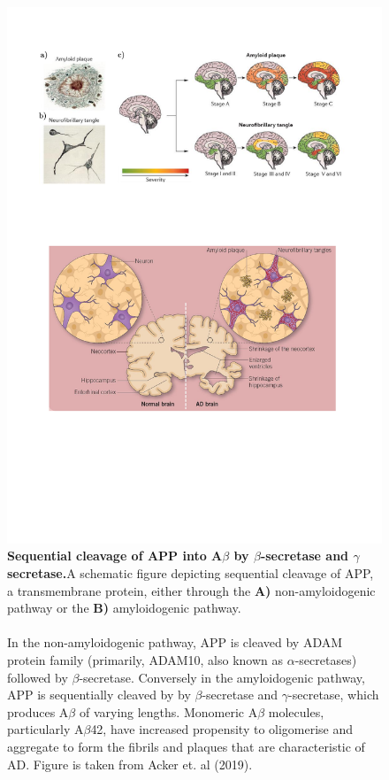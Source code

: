 \begin{figure}[!htp]
	\centering
	\includegraphics[page=2,trim={0.5cm 9cm 0cm 15cm},clip, scale = 0.8]{Figures/Introduction_Figures.pdf}
	\captionsetup{width=0.95\textwidth,singlelinecheck=off}
	\caption[Sequential cleavage of APP into A$\beta$ by $\beta$-secretase and $\gamma$ secretase]%
	{\textbf{Sequential cleavage of APP into A$\beta$ by $\beta$-secretase and $\gamma$ secretase.}A schematic figure depicting sequential cleavage of APP, a transmembrane protein, either through the \textbf{A)} non-amyloidogenic pathway or the \textbf{B)} amyloidogenic pathway.
	\\
	\\
	In the non-amyloidogenic pathway, APP is cleaved by ADAM protein family (primarily, ADAM10, also known as $\alpha$-secretases) followed by $\beta$-secretase. Conversely in the amyloidogenic pathway, APP is sequentially cleaved by by $\beta$-secretase and $\gamma$-secretase, which produces A$\beta$ of varying lengths. Monomeric A$\beta$ molecules, particularly A$\beta$42, have increased propensity to oligomerise and aggregate to form the fibrils and plaques that are characteristic of AD. Figure is taken from Acker et. al (2019)\cite{Acker2019}. 
	}
	\label{fig:APP_Processing}
\end{figure}

